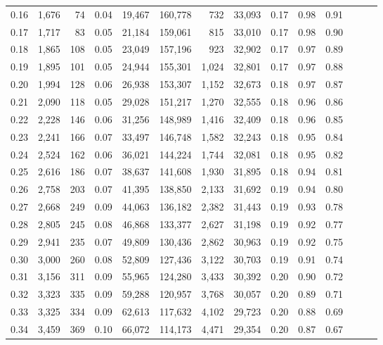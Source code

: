 \begin{tabular}{rrrrrrrrrrrrrr}
0.16 &  1,676 &   74 &  0.04 &   19,467 &  160,778 &     732 &  33,093 &  0.17 &  0.98 &      0.91 \\
0.17 &  1,717 &   83 &  0.05 &   21,184 &  159,061 &     815 &  33,010 &  0.17 &  0.98 &      0.90 \\
0.18 &  1,865 &  108 &  0.05 &   23,049 &  157,196 &     923 &  32,902 &  0.17 &  0.97 &      0.89 \\
0.19 &  1,895 &  101 &  0.05 &   24,944 &  155,301 &   1,024 &  32,801 &  0.17 &  0.97 &      0.88 \\
0.20 &  1,994 &  128 &  0.06 &   26,938 &  153,307 &   1,152 &  32,673 &  0.18 &  0.97 &      0.87 \\
0.21 &  2,090 &  118 &  0.05 &   29,028 &  151,217 &   1,270 &  32,555 &  0.18 &  0.96 &      0.86 \\
0.22 &  2,228 &  146 &  0.06 &   31,256 &  148,989 &   1,416 &  32,409 &  0.18 &  0.96 &      0.85 \\
0.23 &  2,241 &  166 &  0.07 &   33,497 &  146,748 &   1,582 &  32,243 &  0.18 &  0.95 &      0.84 \\
0.24 &  2,524 &  162 &  0.06 &   36,021 &  144,224 &   1,744 &  32,081 &  0.18 &  0.95 &      0.82 \\
0.25 &  2,616 &  186 &  0.07 &   38,637 &  141,608 &   1,930 &  31,895 &  0.18 &  0.94 &      0.81 \\
0.26 &  2,758 &  203 &  0.07 &   41,395 &  138,850 &   2,133 &  31,692 &  0.19 &  0.94 &      0.80 \\
0.27 &  2,668 &  249 &  0.09 &   44,063 &  136,182 &   2,382 &  31,443 &  0.19 &  0.93 &      0.78 \\
0.28 &  2,805 &  245 &  0.08 &   46,868 &  133,377 &   2,627 &  31,198 &  0.19 &  0.92 &      0.77 \\
0.29 &  2,941 &  235 &  0.07 &   49,809 &  130,436 &   2,862 &  30,963 &  0.19 &  0.92 &      0.75 \\
0.30 &  3,000 &  260 &  0.08 &   52,809 &  127,436 &   3,122 &  30,703 &  0.19 &  0.91 &      0.74 \\
0.31 &  3,156 &  311 &  0.09 &   55,965 &  124,280 &   3,433 &  30,392 &  0.20 &  0.90 &      0.72 \\
0.32 &  3,323 &  335 &  0.09 &   59,288 &  120,957 &   3,768 &  30,057 &  0.20 &  0.89 &      0.71 \\
0.33 &  3,325 &  334 &  0.09 &   62,613 &  117,632 &   4,102 &  29,723 &  0.20 &  0.88 &      0.69 \\
0.34 &  3,459 &  369 &  0.10 &   66,072 &  114,173 &   4,471 &  29,354 &  0.20 &  0.87 &      0.67 \\

\end{tabular}
